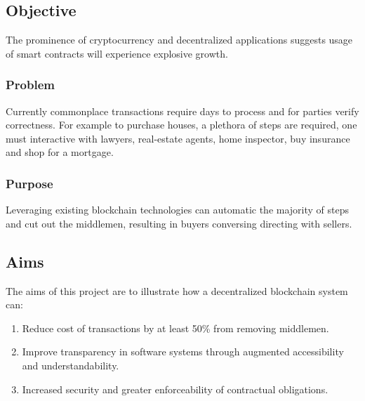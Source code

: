 \subsection{Objective}
The prominence of cryptocurrency and decentralized applications suggests usage of smart contracts will experience explosive growth.

\subsubsection{Problem}

Currently commonplace transactions require days to process and for parties verify correctness. For example to purchase houses, a plethora of steps are required, one must interactive with lawyers, real-estate agents, home inspector, buy insurance and shop for a mortgage. 

\subsubsection{Purpose}
Leveraging existing blockchain technologies can automatic the majority of steps and cut out the middlemen, resulting in buyers conversing directing with sellers.
\subsection{Aims}
The aims of this project are to illustrate how a decentralized blockchain system can:
\begin{enumerate}
\item Reduce cost of transactions by at least 50\% from removing middlemen.
\item Improve transparency in software systems through augmented accessibility and understandability.
\item Increased security and greater enforceability of contractual obligations.
\end{enumerate}

